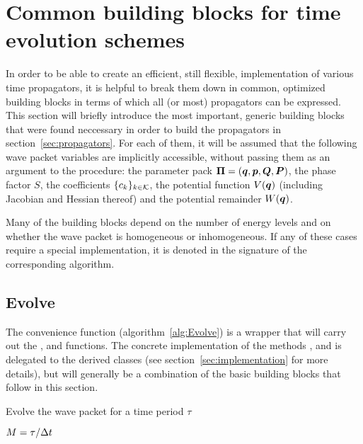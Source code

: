 \section{Common building blocks for time evolution schemes}
\label{sec:buildingblocks}
%
In order to be able to create an efficient, still flexible, implementation of various time propagators, it is helpful to break them down in common, optimized building blocks in terms of which all (or most) propagators can be expressed.
This section will briefly introduce the most important, generic building blocks that were found neccessary in order to build the propagators in section~\ref{sec:propagators}.
For each of them, it will be assumed that the following wave packet variables are implicitly accessible, without passing them as an argument to the procedure: the parameter pack $\bm{\Pi} = (\bm{q},\bm{p},\bm{Q},\bm{P})$, the phase factor $S$, the coefficients $\{ c_k \}_{k \in \mathcal{K}}$, the potential function $V(\bm{q})$ (including Jacobian and Hessian thereof) and the potential remainder $W(\bm{q})$.
\par\medskip
%
Many of the building blocks depend on the number of energy levels and on whether the wave packet is homogeneous or inhomogeneous.
If any of these cases require a special implementation, it is denoted in the signature of the corresponding algorithm.


\subsection{Evolve}
\label{subsec:evolve}
The convenience function  (algorithm~\ref{alg:Evolve}) is a wrapper that will carry out the ,  and  functions.
The concrete implementation of the methods ,  and  is delegated to the derived classes (see section~\ref{sec:implementation} for more details),
but will generally be a combination of the basic building blocks that follow in this section.
%
\begin{algorithm}[h]
	\caption{Evolve the wave packet for a time period $\tau$}
	\label{alg:Evolve}
	\begin{algorithmic}
		\State
		\State
		\State $M = \tau/\Delta t$
		\State {}
			\State {}
		\EndFor
		\State {}
		\State
	\EndProcedure
	\end{algorithmic}
\end{algorithm}


